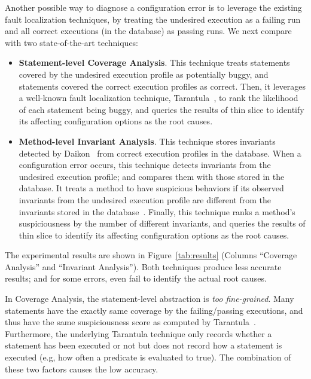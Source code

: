 

Another possible way to diagnose a configuration error is to leverage
the existing fault localization techniques, by treating the undesired
execution as a failing run and all correct executions (in the database)
as passing runs. We next compare \ourtool with two state-of-the-art
techniques: %

\begin{itemize}
\item \textbf{Statement-level Coverage Analysis}. This technique treats statements covered
by the undesired execution profile as potentially buggy, and statements
covered the correct execution profiles as correct.
Then, it leverages a well-known fault localization technique,
Tarantula~\cite{Jones:2002}, to rank the likelihood of each
statement being buggy, and queries the results of thin slice
to identify its affecting configuration options as the root causes.

\item \textbf{Method-level Invariant Analysis}. This technique stores invariants detected
by Daikon~\cite{Ernst:1999} from correct execution profiles in the database.
When a configuration error occurs, this technique detects invariants from the undesired execution profile;
and compares them with those stored in the database.
It treats a method to have suspicious behaviors if its observed invariants
from the undesired execution profile are different from the invariants stored
in the database~\cite{McCamant:2003}. Finally, this technique ranks a method's suspiciousness by
the number of different invariants, and queries the results of thin slice
to identify its affecting configuration options as the root causes. 
\end{itemize}


The experimental results are shown in Figure~\ref{tab:results} (Columns
``Coverage Analysis'' and ``Invariant Analysis'').
Both techniques produce less
accurate results; and for some errors, even fail to identify
the actual root causes.

In Coverage Analysis, the statement-level abstraction is \textit{too fine-grained}.
Many statements have the exactly same coverage by the failing/passing executions,
and thus have the same suspiciousness score as computed by Tarantula~\cite{Jones:2002}.
Furthermore, the underlying Tarantula technique only records whether a
statement has been executed or not but does not record how a statement is 
executed (e.g, how often a predicate is evaluated to true). The combination
of these two factors causes the low accuracy.


